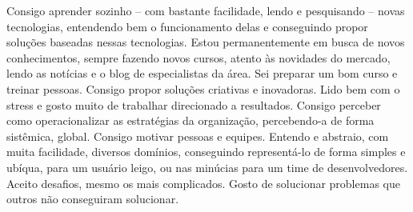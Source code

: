 Consigo aprender sozinho – com bastante facilidade, lendo e pesquisando – novas tecnologias, entendendo bem o funcionamento delas e conseguindo propor soluções baseadas nessas tecnologias. Estou permanentemente em busca de novos conhecimentos, sempre fazendo novos cursos, atento às novidades do mercado, lendo as notícias e o blog de especialistas da área.
Sei preparar um bom curso e treinar pessoas.
Consigo propor soluções criativas e inovadoras.
Lido bem com o stress e gosto muito de trabalhar direcionado a resultados.
Consigo perceber como operacionalizar as estratégias da organização, percebendo-a de forma sistêmica, global.
Consigo motivar pessoas e equipes.
Entendo e abstraio, com muita facilidade, diversos domínios, conseguindo representá-lo de forma simples e ubíqua, para um usuário leigo, ou nas minúcias para um time de desenvolvedores.
Aceito desafios, mesmo os mais complicados.
Gosto de solucionar problemas que outros não conseguiram solucionar.






\begin{refsection}
  \nocite{*}
  \printbibliography[sorting=chronological, type=inproceedings, title={international peer-reviewed conferences/proceedings}, notkeyword={france}, heading=subbibliography]
\end{refsection}
\begin{refsection}
  \nocite{*}
  \printbibliography[sorting=chronological, type=inproceedings, title={local peer-reviewed conferences/proceedings}, keyword={france}, heading=subbibliography]
\end{refsection}



